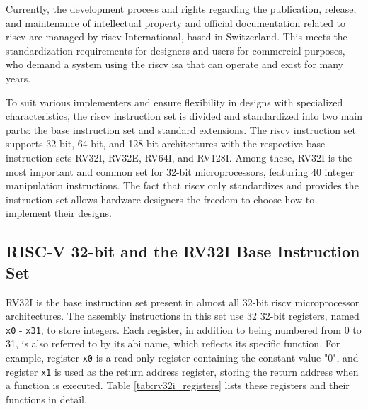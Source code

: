 Currently, the development process and rights regarding the publication, release, and maintenance of intellectual property and official documentation related to \acrshort{riscv} are managed by \acrshort{riscv} International, based in Switzerland. This meets the standardization requirements for designers and users for commercial purposes, who demand a system using the \acrshort{riscv} \acrshort{isa} that can operate and exist for many years.

To suit various implementers and ensure flexibility in designs with specialized characteristics, the \acrshort{riscv} instruction set is divided and standardized into two main parts: the base instruction set and standard extensions. The \acrshort{riscv} instruction set supports 32-bit, 64-bit, and 128-bit architectures with the respective base instruction sets RV32I, RV32E, RV64I, and RV128I. Among these, RV32I is the most important and common set for 32-bit microprocessors, featuring 40 integer manipulation instructions. The fact that \acrshort{riscv} only standardizes and provides the instruction set allows hardware designers the freedom to choose how to implement their designs.

\subsection{RISC-V 32-bit and the RV32I Base Instruction Set}

RV32I \cite{riscv:manual:user:2024} is the base instruction set present in almost all 32-bit \acrshort{riscv} microprocessor architectures. The assembly instructions in this set use 32 32-bit registers, named \texttt{x0} - \texttt{x31}, to store integers. Each register, in addition to being numbered from 0 to 31, is also referred to by its \acrfull{abi} name, which reflects its specific function. For example, register \texttt{x0} is a read-only register containing the constant value "0", and register \texttt{x1} is used as the return address register, storing the return address when a function is executed. Table \ref{tab:rv32i_registers} lists these registers and their functions in detail.

